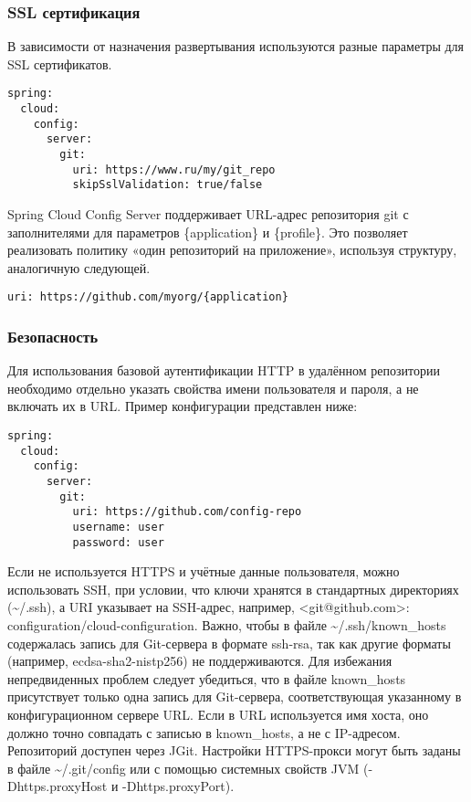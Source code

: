 \subsubsection{SSL сертификация}

В зависимости от назначения развертывания используются разные параметры для SSL сертификатов.

\begin{verbatim}
spring:
  cloud:
    config:
      server:
        git:
          uri: https://www.ru/my/git_repo
          skipSslValidation: true/false
\end{verbatim}

Spring Cloud Config Server поддерживает URL-адрес репозитория git с заполнителями для параметров \{application\} и \{profile\}.
Это позволяет реализовать политику «один репозиторий на приложение», используя структуру, аналогичную следующей.

\begin{verbatim}
uri: https://github.com/myorg/{application}
\end{verbatim}

\subsubsection{Безопасность}

Для использования базовой аутентификации HTTP в удалённом репозитории необходимо отдельно указать свойства имени пользователя и пароля, а не включать их в URL. Пример конфигурации представлен ниже:

\begin{verbatim}
spring:
  cloud:
    config:
      server:
        git:
          uri: https://github.com/config-repo
          username: user
          password: user
\end{verbatim}

Если не используется HTTPS и учётные данные пользователя, можно использовать SSH, при условии, что ключи хранятся в стандартных директориях (\textasciitilde{}/.ssh), а URI указывает на SSH-адрес, например, <git@github.com>: configuration/cloud-configuration.
Важно, чтобы в файле \textasciitilde{}/.ssh/known\_hosts содержалась запись для Git-сервера в формате ssh-rsa, так как другие форматы (например, ecdsa-sha2-nistp256) не поддерживаются.
Для избежания непредвиденных проблем следует убедиться, что в файле known\_hosts присутствует только одна запись для Git-сервера, соответствующая указанному в конфигурационном сервере URL. Если в URL используется имя хоста, оно должно точно совпадать с записью в known\_hosts, а не с IP-адресом.
Репозиторий доступен через JGit.
Настройки HTTPS-прокси могут быть заданы в файле \textasciitilde{}/.git/config или с помощью системных свойств JVM (-Dhttps.proxyHost и -Dhttps.proxyPort).

